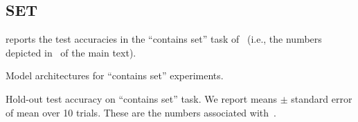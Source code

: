 \subsection{SET}

 reports the test accuracies in the ``contains set'' task of~ (i.e., the numbers depicted in~ of the main text).

\begin{table}[h]
    \centering
    
    \caption{Model architectures for ``contains set'' experiments.}\label{tab:set_architectures}
\end{table}

\begin{table}[h]
    \centering
    
    \caption{Hold-out test accuracy on ``contains set'' task. We report means $\pm$ standard error of mean over 10 trials. These are the numbers associated with~.}\label{tab:set_acc}
\end{table}